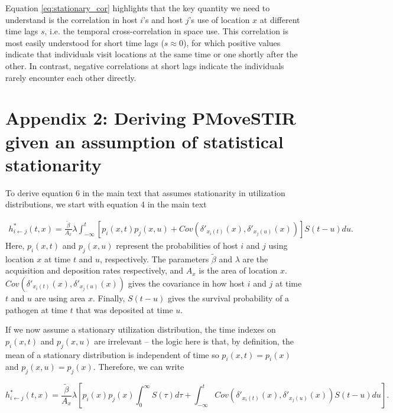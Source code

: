 \documentclass[letterpaper]{article}
\begin{document}
Equation \ref{eq:stationary_cor} highlights that the key quantity we need to understand is the correlation in host $i$'s and host $j$'s use of location $x$ at different time lags $s$, i.e. the temporal cross-correlation in space use.
This correlation is most easily understood for short time lags ($s\approx0$), for which positive values indicate that individuals visit locations at the same time or one shortly after the other. In contrast, negative correlations at short lags indicate the individuals rarely encounter each other directly.

\section*{Appendix 2: Deriving PMoveSTIR given an assumption of statistical stationarity}

To derive equation 6 in the main text that assumes stationarity in utilization distributions, we start with equation 4 in the main text

\begin{equation}
    \begin{aligned}
        h^*_{i \leftarrow j}(t, x) = \frac{\tilde{\beta}}{A_x} \lambda \int_{-\infty}^{t} [p_i(x, t) p_j(x, u) + Cov(\delta'_{x_i(t)}(x), \delta'_{x_j(u)}(x))] S(t - u) du.
    \end{aligned}
    \label{eq:foi_cov}
\end{equation}
Here, $p_i(x, t)$ and $p_j(x, u)$ represent the probabilities of host $i$ and $j$ using location $x$ at time $t$ and $u$, respectively. The parameters $\tilde{\beta}$ and $\lambda$ are the acquisition and deposition rates respectively, and $A_x$ is the area of location $x$.  $Cov(\delta'_{x_i(t)}(x), \delta'_{x_j(u)}(x))$ gives the covariance in how host $i$ and $j$ at time $t$ and $u$ are using area $x$.  Finally, $S(t - u)$  gives the survival probability of a pathogen at time $t$ that was deposited at time $u$. 

If we now assume a stationary utilization distribution, the time indexes on $p_i(x, t)$ and $p_j(x, u)$ are irrelevant -- the logic here is that, by definition, the mean of a stationary distribution is independent of time so $p_i(x, t) = p_i(x)$ and $p_j(x, u) = p_j(x)$. Therefore, we can write  

$$
h^*_{i \leftarrow j}(t, x) = \frac{\tilde{\beta}}{A_x} \lambda \left[p_i(x) p_j(x) \int_0^\infty S(\tau) d\tau  + \int_{-\infty}^t Cov(\delta'_{x_i(t)}(x), \delta'_{x_j(u)}(x)) S(t - u) du\right].
$$
\end{document}
